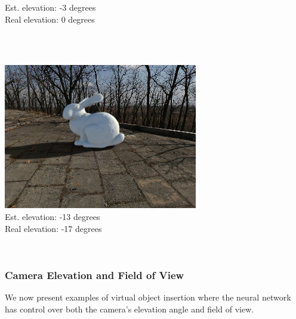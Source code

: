 \begin{multicols}{2}
\begin{minipage}{\linewidth}
Est. elevation: -3 degrees\\
Real elevation: 0 degrees\\
\end{minipage} \\
~\\
\begin{minipage}{\linewidth}
\includegraphics[width=\mywidth]{pano_aczfirgbavyyri.jpg}\\
Est. elevation: -13 degrees\\
Real elevation: -17 degrees\\
\end{minipage} \\

\end{multicols}

\FloatBarrier
\clearpage
\subsubsection{Camera Elevation and Field of View}

We now present examples of virtual object insertion where the neural
network has control over both the camera's elevation angle and field of
view.

